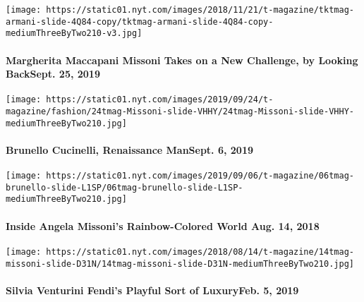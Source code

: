 \texttt{[image: https://static01.nyt.com/images/2018/11/21/t-magazine/tktmag-armani-slide-4Q84-copy/tktmag-armani-slide-4Q84-copy-mediumThreeByTwo210-v3.jpg]}
\href{https://www.nytimes.com/2019/09/25/t-magazine/margherita-maccapani-missoni-fashion-week.html}{}

\hypertarget{margherita-maccapani-missoni-takes-on-a-new-challenge-by-looking-backsept-25-2019}{%
\paragraph{Margherita Maccapani Missoni Takes on a New Challenge, by
Looking BackSept. 25,
2019}\label{margherita-maccapani-missoni-takes-on-a-new-challenge-by-looking-backsept-25-2019}}

\texttt{[image: https://static01.nyt.com/images/2019/09/24/t-magazine/fashion/24tmag-Missoni-slide-VHHY/24tmag-Missoni-slide-VHHY-mediumThreeByTwo210.jpg]}
\href{https://www.nytimes.com/2019/09/06/t-magazine/brunello-cucinelli.html}{}

\hypertarget{brunello-cucinelli-renaissance-mansept-6-2019}{%
\paragraph{Brunello Cucinelli, Renaissance ManSept. 6,
2019}\label{brunello-cucinelli-renaissance-mansept-6-2019}}

\texttt{[image: https://static01.nyt.com/images/2019/09/06/t-magazine/06tmag-brunello-slide-L1SP/06tmag-brunello-slide-L1SP-mediumThreeByTwo210.jpg]}
\href{https://www.nytimes.com/2018/08/14/t-magazine/angela-missoni-fashion-designer-inspiration.html}{}

\hypertarget{inside-angela-missonis-rainbow-colored-world-aug-14-2018}{%
\paragraph{Inside Angela Missoni's Rainbow-Colored World Aug. 14,
2018}\label{inside-angela-missonis-rainbow-colored-world-aug-14-2018}}

\texttt{[image: https://static01.nyt.com/images/2018/08/14/t-magazine/14tmag-missoni-slide-D31N/14tmag-missoni-slide-D31N-mediumThreeByTwo210.jpg]}
\href{https://www.nytimes.com/2019/02/05/t-magazine/silvia-venturini-fendi-inspiration.html}{}

\hypertarget{silvia-venturini-fendis-playful-sort-of-luxuryfeb-5-2019}{%
\paragraph{Silvia Venturini Fendi's Playful Sort of LuxuryFeb. 5,
2019}\label{silvia-venturini-fendis-playful-sort-of-luxuryfeb-5-2019}}

